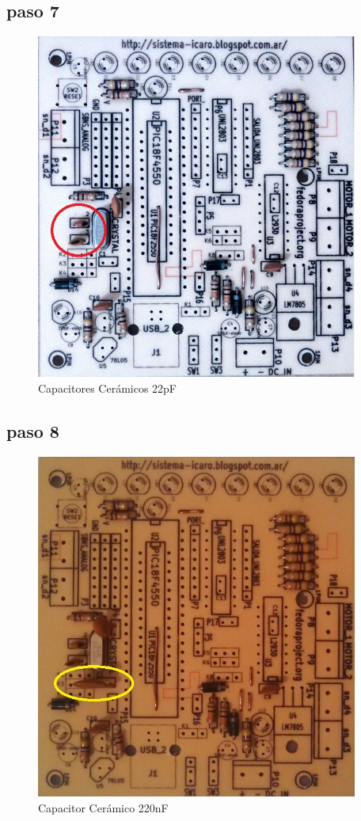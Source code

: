 \documentclass[letterpaper,10pt,english]{sphinxmanual}
\begin{document}
\subsection{paso 7}
\label{np07:paso-7}\begin{figure}[htbp]
\centering
\capstart

\includegraphics[width=300pt]{7b.jpg}
\caption{Capacitores Cerámicos 22pF}\end{figure}
\newpage

\subsection{paso 8}
\label{np07:paso-8}\begin{figure}[htbp]
\centering
\capstart

\includegraphics[width=300pt]{8b.jpg}
\caption{Capacitor Cerámico 220nF}\end{figure}
\newpage
\end{document}

